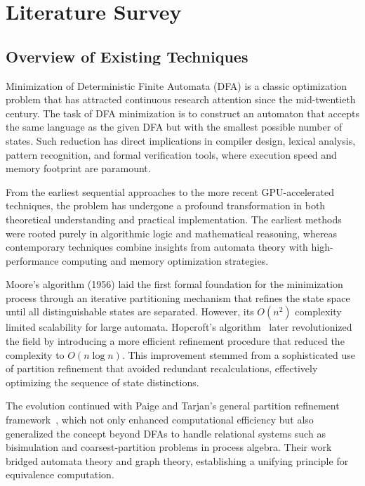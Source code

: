 \chapter{Literature Survey}
\label{chap:literature_survey}

\section{Overview of Existing Techniques}

Minimization of Deterministic Finite Automata (DFA) is a classic optimization problem that has attracted continuous research attention since the mid-twentieth century. The task of DFA minimization is to construct an automaton that accepts the same language as the given DFA but with the smallest possible number of states. Such reduction has direct implications in compiler design, lexical analysis, pattern recognition, and formal verification tools, where execution speed and memory footprint are paramount.

From the earliest sequential approaches to the more recent GPU-accelerated techniques, the problem has undergone a profound transformation in both theoretical understanding and practical implementation. The earliest methods were rooted purely in algorithmic logic and mathematical reasoning, whereas contemporary techniques combine insights from automata theory with high-performance computing and memory optimization strategies.

Moore’s algorithm (1956) laid the first formal foundation for the minimization process through an iterative partitioning mechanism that refines the state space until all distinguishable states are separated. However, its $O(n^2)$ complexity limited scalability for large automata. Hopcroft’s algorithm~\cite{hopcroft1971} later revolutionized the field by introducing a more efficient refinement procedure that reduced the complexity to $O(n \log n)$. This improvement stemmed from a sophisticated use of partition refinement that avoided redundant recalculations, effectively optimizing the sequence of state distinctions.

The evolution continued with Paige and Tarjan’s general partition refinement framework~\cite{paigetarjan1987}, which not only enhanced computational efficiency but also generalized the concept beyond DFAs to handle relational systems such as bisimulation and coarsest-partition problems in process algebra. Their work bridged automata theory and graph theory, establishing a unifying principle for equivalence computation.

